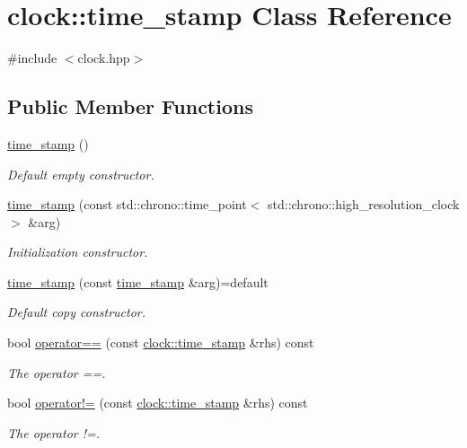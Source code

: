 \hypertarget{classclock_1_1time__stamp}{}\section{clock\+:\+:time\+\_\+stamp Class Reference}
\label{classclock_1_1time__stamp}


{\ttfamily \#include $<$clock.\+hpp$>$}

\subsection*{Public Member Functions}
\begin{DoxyCompactItemize}
\item 
\hyperlink{classclock_1_1time__stamp_ad282b7a46ce34644f51a3bef3f1bb7fd}{time\+\_\+stamp} ()
\begin{DoxyCompactList}\small\item\em Default empty constructor. \end{DoxyCompactList}\item 
\hyperlink{classclock_1_1time__stamp_aa9db340d883a5775b04ed3312a49df9b}{time\+\_\+stamp} (const std\+::chrono\+::time\+\_\+point$<$ std\+::chrono\+::high\+\_\+resolution\+\_\+clock $>$ \&arg)
\begin{DoxyCompactList}\small\item\em Initialization constructor. \end{DoxyCompactList}\item 
\hyperlink{classclock_1_1time__stamp_abfbb4465625c1be83c5e127d1ef92548}{time\+\_\+stamp} (const \hyperlink{classclock_1_1time__stamp}{time\+\_\+stamp} \&arg)=default
\begin{DoxyCompactList}\small\item\em Default copy constructor. \end{DoxyCompactList}\item 
bool \hyperlink{classclock_1_1time__stamp_a1c9fdbedb59b4f9d413dc599edaa7841}{operator==} (const \hyperlink{classclock_1_1time__stamp}{clock\+::time\+\_\+stamp} \&rhs) const 
\begin{DoxyCompactList}\small\item\em The operator ==. \end{DoxyCompactList}\item 
bool \hyperlink{classclock_1_1time__stamp_adb5a614cf5fbb48a6d7815c955bee6a3}{operator!=} (const \hyperlink{classclock_1_1time__stamp}{clock\+::time\+\_\+stamp} \&rhs) const 
\begin{DoxyCompactList}\small\item\em The operator !=. \end{DoxyCompactList}\item 

\end{DoxyCompactItemize}
